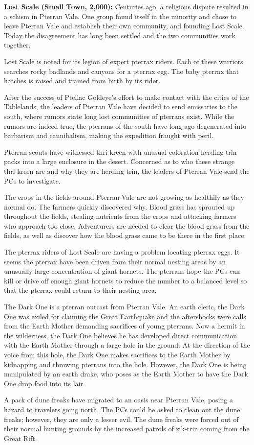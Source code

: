{
	\textbf{Lost Scale (Small Town, 2,000):} Centuries ago, a religious dispute resulted in a schism in Pterran Vale. One group found itself in the minority and chose to leave Pterran Vale and establish their own community, and founding Lost Scale. Today the disagreement has long been settled and the two communities work together.

	Lost Scale is noted for its legion of expert pterrax riders. Each of these warriors searches rocky badlands and canyons for a pterrax egg. The baby pterrax that hatches is raised and trained from birth by its rider.
}
{}
{
	\item After the success of Ptellac Goldeye's effort to make contact with the cities of the Tablelands, the leaders of Pterran Vale have decided to send emissaries to the south, where rumors state long lost communities of pterrans exist. While the rumors are indeed true, the pterrans of the south have long ago degenerated into barbarism and cannibalism, making the expedition fraught with peril.
	\item Pterran scouts have witnessed thri-kreen with unusual coloration herding trin packs into a large enclosure in the desert. Concerned as to who these strange thri-kreen are and why they are herding trin, the leaders of Pterran Vale send the PCs to investigate.
	\item The crops in the fields around Pterran Vale are not growing as healthily as they normal do. The farmers quickly discovered why. Blood grass has sprouted up throughout the fields, stealing nutrients from the crops and attacking farmers who approach too close. Adventurers are needed to clear the blood grass from the fields, as well as discover how the blood grass came to be there in the first place.
	\item The pterrax riders of Lost Scale are having a problem locating pterrax eggs. It seems the pterrax have been driven from their normal nesting areas by an unusually large concentration of giant hornets. The pterrans hope the PCs can kill or drive off enough giant hornets to reduce the number to a balanced level so that the pterrax could return to their nesting area.
	\item The Dark One is a pterran outcast from Pterran Vale. An earth cleric, the Dark One was exiled for claiming the Great Earthquake and the aftershocks were calls from the Earth Mother demanding sacrifices of young pterrans. Now a hermit in the wilderness, the Dark One believes he has developed direct communication with the Earth Mother through a large hole in the ground. At the direction of the voice from this hole, the Dark One makes sacrifices to the Earth Mother by kidnapping and throwing pterrans into the hole. However, the Dark One is being manipulated by an earth drake, who poses as the Earth Mother to have the Dark One drop food into its lair.
	\item A pack of dune freaks have migrated to an oasis near Pterran Vale, posing a hazard to travelers going north. The PCs could be asked to clean out the dune freaks; however, they are only a lesser evil. The dune freaks were forced out of their normal hunting grounds by the increased patrols of zik-trin coming from the Great Rift.
}
